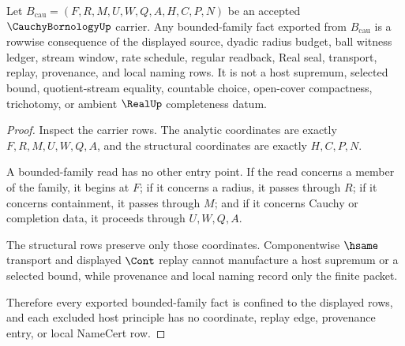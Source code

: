 \begin{theorem}
\label{thm:cauchy-bornology-bounded-family-nonescape}
Let $B_{\mathrm{cau}}=(F,R,M,U,W,Q,A,H,C,P,N)$ be an accepted $\CauchyBornologyUp$ carrier. Any bounded-family fact exported from $B_{\mathrm{cau}}$ is a rowwise consequence of the displayed source, dyadic radius budget, ball witness ledger, stream window, rate schedule, regular readback, Real seal, transport, replay, provenance, and local naming rows. It is not a host supremum, selected bound, quotient-stream equality, countable choice, open-cover compactness, trichotomy, or ambient $\RealUp$ completeness datum.
\end{theorem}
\begin{proof}
Inspect the carrier rows. The analytic coordinates are exactly $F,R,M,U,W,Q,A$, and the structural coordinates are exactly $H,C,P,N$.

A bounded-family read has no other entry point. If the read concerns a member of the family, it begins at $F$; if it concerns a radius, it passes through $R$; if it concerns containment, it passes through $M$; and if it concerns Cauchy or completion data, it proceeds through $U,W,Q,A$.

The structural rows preserve only those coordinates. Componentwise $\hsame$ transport and displayed $\Cont$ replay cannot manufacture a host supremum or a selected bound, while provenance and local naming record only the finite packet.

Therefore every exported bounded-family fact is confined to the displayed rows, and each excluded host principle has no coordinate, replay edge, provenance entry, or local NameCert row.
\end{proof}


